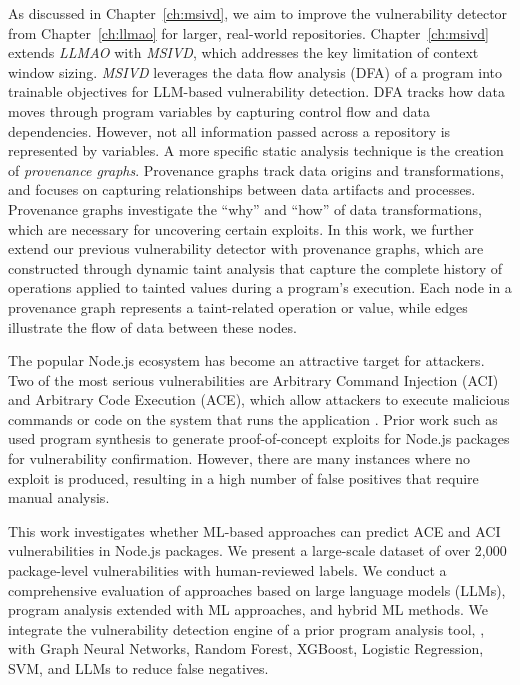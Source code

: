 \documentclass[12pt,openany,oneside,table]{cmuthesis}
\begin{document}
As discussed in Chapter~\ref{ch:msivd}, we aim to improve the vulnerability detector from Chapter~\ref{ch:llmao} for larger, real-world repositories. Chapter~\ref{ch:msivd} extends \textit{LLMAO} with \textit{MSIVD}, which addresses the key limitation of context window sizing. \textit{MSIVD} leverages the data flow analysis (DFA) of a program into trainable objectives for LLM-based vulnerability detection. DFA tracks how data moves through program variables by capturing control flow and data dependencies. However, not all information passed across a repository is represented by variables. A more specific static analysis technique is the creation of \textit{provenance graphs}. Provenance graphs track data origins and transformations, and focuses on capturing relationships between data artifacts and processes. Provenance graphs investigate the ``why'' and ``how'' of data transformations, which are necessary for uncovering certain exploits. In this work, we further extend our previous vulnerability detector with provenance graphs, which are constructed through dynamic taint analysis that capture the
complete history of operations applied to tainted values during a program’s execution. Each node in a provenance graph represents a taint-related operation or value, while edges illustrate the flow of data between these nodes.

The popular Node.js ecosystem has become an attractive target for attackers. Two of the most serious vulnerabilities are Arbitrary Command Injection (ACI) and Arbitrary Code Execution (ACE), which allow attackers to execute malicious commands or code on the system that runs the application \cite{cwe_94, cwe_77}. Prior work such as \nodemedicfine used program synthesis to generate proof-of-concept exploits for Node.js packages for vulnerability confirmation. However, there are many instances where no exploit is produced, resulting in a high number of false positives that require manual analysis. 

This work investigates whether ML-based approaches can predict ACE and ACI vulnerabilities in Node.js packages. We present a large-scale dataset of over 2,000 package-level vulnerabilities with human-reviewed labels. We conduct a comprehensive evaluation of approaches based on large language models (LLMs), program analysis extended with ML approaches, and hybrid ML methods.
We integrate the vulnerability detection engine of a prior program analysis tool, \nodemedic, with Graph Neural Networks, Random Forest, XGBoost, Logistic Regression, SVM, and LLMs to reduce false negatives.
\end{document}
